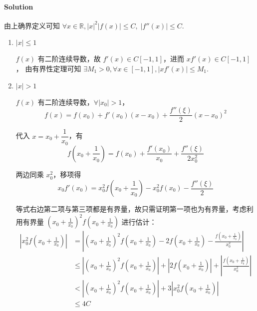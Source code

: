 \documentclass{ctexart}
\begin{document}
\paragraph{Solution}
    由上确界定义可知 $\forall x \in \mathbb{R}, |x|^2 |f(x)|\leqslant C, \; |f''(x)|\leqslant C$.
    \begin{enumerate}
        \item $|x|\leqslant 1$

            $f(x)$ 有二阶连续导数，故 $f'(x) \in C[-1,1]$，进而 $xf'(x) \in C[-1,1]$，
            由有界性定理可知 $\exists M_1>0, \forall x \in [-1,1], |xf'(x)|\leqslant M_1$.

        \item $|x|>1$

            $f(x)$ 有二阶连续导数，$\forall |x_0|>1$，\begin{equation}
                f(x) = f(x_0) + f'(x_0)(x-x_0) + \frac{f''(\xi)}{2}(x-x_0)^2
            \end{equation}

            代入 $x=x_0+\dfrac{1}{x_0}$，有 \begin{equation}
                f(x_0+\frac{1}{x_0}) = f(x_0) + \frac{f'(x_0)}{x_0} + \frac{f''(\xi)}{2x_0^2}
            \end{equation}

            两边同乘 $x_0^2$，移项得 \begin{equation}
                x_0 f'(x_0) = x_0^2 f(x_0+\frac{1}{x_0}) - x_0^2 f(x_0) - \frac{f''(\xi)}{2}  \label{eq:result1}
            \end{equation}

            等式右边第二项与第三项都是有界量，故只需证明第一项也为有界量，考虑利用有界量 $(x_0+\frac{1}{x_0})^2 f(x_0+\frac{1}{x_0})$ 进行估计：
            \begin{equation} \label{eq:result2}
                \begin{aligned}
                \left| x_0^2 f(x_0+\frac{1}{x_0}) \right| &= \left| (x_0+\frac{1}{x_0})^2 f(x_0+\frac{1}{x_0}) - 2f(x_0+\frac{1}{x_0}) - \frac{f(x_0+\frac{1}{x_0})}{x_0^2} \right| \\
                                                            &\leqslant \left| (x_0+\frac{1}{x_0})^2 f(x_0+\frac{1}{x_0}) \right| + \left| 2f(x_0+\frac{1}{x_0}) \right| + \left| \frac{f(x_0+\frac{1}{x_0})}{x_0^2} \right| \\
                                                            &< \left| (x_0+\frac{1}{x_0})^2 f(x_0+\frac{1}{x_0}) \right| + 3 \left| x_0^2 f(x_0+\frac{1}{x_0}) \right| \\
                                                            &\leqslant 4C
                \end{aligned}
            \end{equation}


\end{enumerate}
\end{document}

